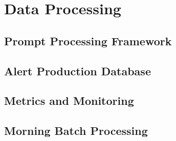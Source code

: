 \section{Data Processing} \label{sec:data-processing}


\subsection{Prompt Processing Framework} \label{sec:pp}

\citep{2026arXiv260319541F}

\subsection{Alert Production Database} \label{sec:apdb}

\subsection{Metrics and Monitoring}

\subsection{Morning Batch Processing}


